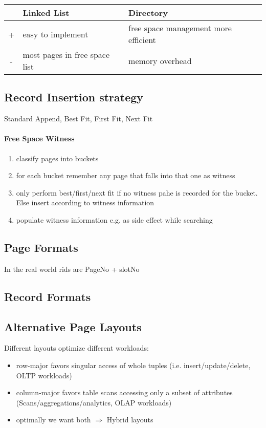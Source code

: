 

\begin{tabular}{c|p{3cm}|p{3cm}}
     & Linked List & Directory \\ \hline
 + & easy to implement & free space management more efficient \\ \hline
 - & most pages in free space list & memory overhead \\
\end{tabular}


    
\subsection{Record Insertion strategy}
Standard Append, Best Fit, First Fit, Next Fit \\
\paragraph{Free Space Witness}
\begin{enumerate}
    \item classify pages into buckets
    \item for each bucket remember any page that falls into that one as witness
    \item only perform best/first/next fit if no witness pahe is recorded for the bucket. Else insert according to witness information
    \item populate witness information e.g. as side effect while searching
\end{enumerate}

\subsection{Page Formats}
In the real world rids are PageNo + slotNo \\

\subsection{Record Formats}

\subsection{Alternative Page Layouts}
Different layouts optimize different workloads:
\begin{itemize}
    \item row-major favors singular access of whole tuples (i.e. insert/update/delete, OLTP workloads)
    \item column-major favors table scans accessing only a subset of attributes (Scans/aggregations/analytics, OLAP workloads)
    \item optimally we want both $\Rightarrow$ Hybrid layouts
\end{itemize}

